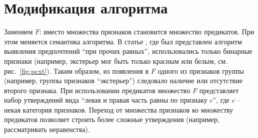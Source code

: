 \chapter{Модификация алгоритма}
\label{chapter:modification}

Заменяем $F$: вместо множества признаков становится множество предикатов. При этом меняется семантика алгоритма. В статье \cite{Obiedkov:2013}, где был представлен алгоритм выявления предпочтений \enquote{при прочих равных}, использовались только бинарные признаки (например, экстерьер мог быть только красным или белым, см. рис.~\ref{fig:pcxt}). Таким образом, из появления в $F$ одного из признаков группы (например, группы признаков ``экстерьер'') следовало наличие или отсутствие второго признака. При использовании предикатов множество $F$ представляет набор утверждений вида ``левая и правая часть равны по признаку $c$'', где $c$ – некая категория признаков. Переход от множества признаков ко множеству предикатов позволяет строить более сложные утверждения (например, рассматривать неравенства).

